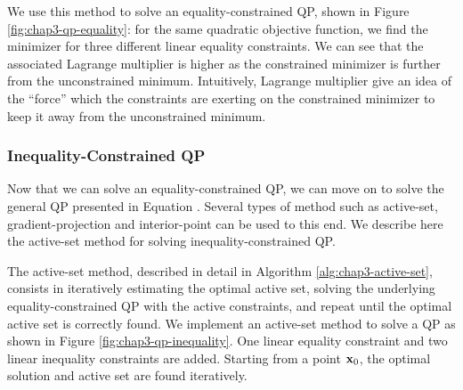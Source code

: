 We use this method to solve an equality-constrained QP, shown in
Figure \ref{fig:chap3-qp-equality}: for the same quadratic objective
function, we find the minimizer for three different linear equality
constraints. We can see that the associated Lagrange multiplier is
higher as the constrained minimizer is further from the unconstrained
minimum. Intuitively, Lagrange multiplier give an idea of the
``force'' which the constraints are exerting on the constrained
minimizer to keep it away from the unconstrained minimum.

\subsubsection{Inequality-Constrained QP}

Now that we can solve an equality-constrained QP, we can move on to
solve the general QP presented in Equation
. Several types of method such as active-set,
gradient-projection and interior-point can be used to this end. We
describe here the active-set method for solving inequality-constrained
QP.

The active-set method, described in detail in Algorithm
\ref{alg:chap3-active-set}, consists in iteratively estimating the
optimal active set, solving the underlying equality-constrained QP
with the active constraints, and repeat until the optimal active set
is correctly found. We implement an active-set method to solve a QP as
shown in Figure \ref{fig:chap3-qp-inequality}. One linear equality
constraint and two linear inequality constraints are added. Starting
from a point $\mathbf{x}_0$, the optimal solution and active set are
found iteratively.

